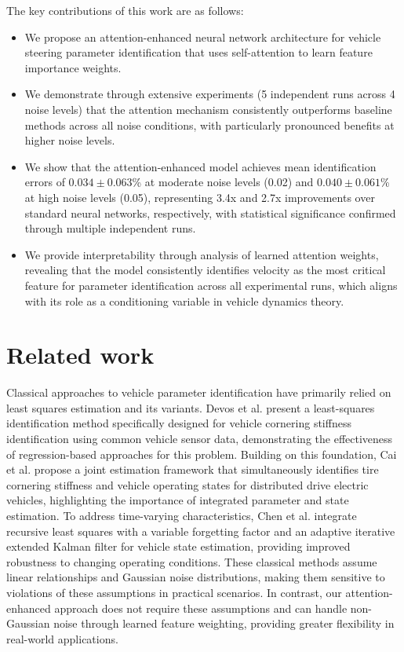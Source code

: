 \documentclass[Afour,sageh,times]{sagej}
\begin{document}
The key contributions of this work are as follows:
\begin{itemize}
    \item We propose an attention-enhanced neural network architecture for vehicle steering parameter identification that uses self-attention to learn feature importance weights.
    \item We demonstrate through extensive experiments (5 independent runs across 4 noise levels) that the attention mechanism consistently outperforms baseline methods across all noise conditions, with particularly pronounced benefits at higher noise levels.
    \item We show that the attention-enhanced model achieves mean identification errors of $0.034 \pm 0.063$\% at moderate noise levels (0.02) and $0.040 \pm 0.061$\% at high noise levels (0.05), representing 3.4x and 2.7x improvements over standard neural networks, respectively, with statistical significance confirmed through multiple independent runs.
    \item We provide interpretability through analysis of learned attention weights, revealing that the model consistently identifies velocity as the most critical feature for parameter identification across all experimental runs, which aligns with its role as a conditioning variable in vehicle dynamics theory.
\end{itemize}

\section{Related work}
\label{sec:related}

Classical approaches to vehicle parameter identification have primarily relied on least squares estimation and its variants. Devos et al. \citep{Devos2024ALI} present a least-squares identification method specifically designed for vehicle cornering stiffness identification using common vehicle sensor data, demonstrating the effectiveness of regression-based approaches for this problem. Building on this foundation, Cai et al. \citep{Cai2025JointEO} propose a joint estimation framework that simultaneously identifies tire cornering stiffness and vehicle operating states for distributed drive electric vehicles, highlighting the importance of integrated parameter and state estimation. To address time-varying characteristics, Chen et al. \citep{Chen2024VehicleSE} integrate recursive least squares with a variable forgetting factor and an adaptive iterative extended Kalman filter for vehicle state estimation, providing improved robustness to changing operating conditions. These classical methods assume linear relationships and Gaussian noise distributions, making them sensitive to violations of these assumptions in practical scenarios. In contrast, our attention-enhanced approach does not require these assumptions and can handle non-Gaussian noise through learned feature weighting, providing greater flexibility in real-world applications.
\end{document}
